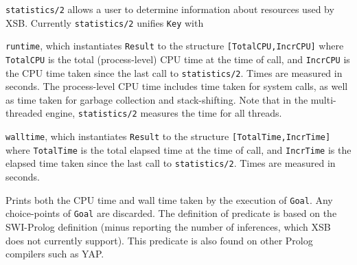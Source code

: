 \begin{description}
%
{\tt statistics/2} allows a user to determine information about
resources used by XSB.  Currently {\tt statistics/2} unifies {\tt Key}
with
\bi
\item {\tt runtime}, which instantiates {\tt Result} to the structure
  {\tt [TotalCPU,IncrCPU]} where {\tt TotalCPU} is the total
  (process-level) CPU time at the time of call, and {\tt IncrCPU} is
  the CPU time taken since the last call to {\tt statistics/2}.  Times
  are measured in seconds.  The process-level CPU time includes time
  taken for system calls, as well as time taken for garbage collection
  and stack-shifting.  Note that in the multi-threaded engine,
  {\tt statistics/2} measures the time for all threads.
%
\item {\tt walltime}, which instantiates {\tt Result} to the structure
  {\tt [TotalTime,IncrTime]} where {\tt TotalTime} is the total
  elapsed time at the time of call, and {\tt IncrTime} is the elapsed
  time taken since the last call to {\tt statistics/2}.  Times are
  measured in seconds.  
\ei


%
Prints both the CPU time and wall time taken by the execution of \texttt{Goal}.
Any choice-points of \texttt{Goal} are discarded. The definition of predicate is based 
on the SWI-Prolog definition (minus reporting the number of inferences, which XSB does 
not currently support). This predicate is also found on other Prolog compilers such as YAP.


\end{description}
